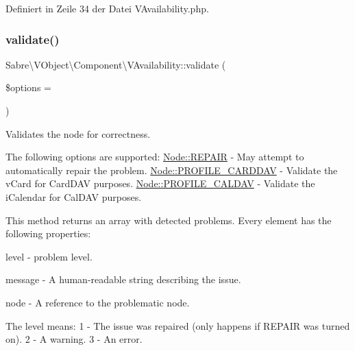 Definiert in Zeile 34 der Datei V\+Availability.\+php.

\mbox{\label{class_sabre_1_1_v_object_1_1_component_1_1_v_availability_abea895824302a99c9e11b9ce39080ca3}} 
\subsubsection{\texorpdfstring{validate()}{validate()}}
{\footnotesize\ttfamily Sabre\textbackslash{}\+V\+Object\textbackslash{}\+Component\textbackslash{}\+V\+Availability\+::validate (\begin{DoxyParamCaption}\item[{}]{\$options = {} }\end{DoxyParamCaption})}

Validates the node for correctness.

The following options are supported\+: \mbox{\hyperlink{class_sabre_1_1_v_object_1_1_node_ac97a7fb85c1f871523336cd1ec6b29a9}{Node\+::\+R\+E\+P\+A\+IR}} -\/ May attempt to automatically repair the problem. \mbox{\hyperlink{class_sabre_1_1_v_object_1_1_node_a0aac3de0b04bcc44bbf0e22ae47a51c3}{Node\+::\+P\+R\+O\+F\+I\+L\+E\+\_\+\+C\+A\+R\+D\+D\+AV}} -\/ Validate the v\+Card for Card\+D\+AV purposes. \mbox{\hyperlink{class_sabre_1_1_v_object_1_1_node_a1e68f819b7b5537929290e061ffeacc5}{Node\+::\+P\+R\+O\+F\+I\+L\+E\+\_\+\+C\+A\+L\+D\+AV}} -\/ Validate the i\+Calendar for Cal\+D\+AV purposes.

This method returns an array with detected problems. Every element has the following properties\+:


\begin{DoxyItemize}
\item level -\/ problem level.
\item message -\/ A human-\/readable string describing the issue.
\item node -\/ A reference to the problematic node.
\end{DoxyItemize}

The level means\+: 1 -\/ The issue was repaired (only happens if R\+E\+P\+A\+IR was turned on). 2 -\/ A warning. 3 -\/ An error.


